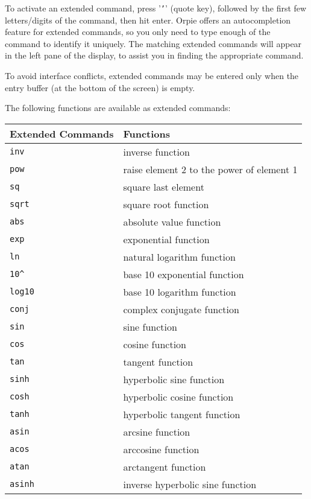 \documentclass[11pt,notitlepage]{article}
\begin{document}
To activate an extended command, press '{\tt '}' (quote key), followed by the
first few letters/digits of the command, then hit enter.  Orpie offers an
autocompletion feature for extended commands, so you only need to type enough of
the command to identify it uniquely.  The matching extended commands will appear
in the left pane of the display, to assist you in finding the appropriate
command.

To avoid interface conflicts, extended commands may be entered only when the
entry buffer (at the bottom of the screen) is empty.

The following functions are available as extended commands:
\begin{center}
   \begin{tabular}[t]{|l|l|}
      \hline Extended Commands & Functions \\
      \hline
      {\tt inv} & inverse function \\
      {\tt pow} & raise element 2 to the power of element 1 \\
      {\tt sq}  & square last element \\
      {\tt sqrt} & square root function \\
      {\tt abs } & absolute value function \\
      {\tt exp } & exponential function \\
      {\tt ln } & natural logarithm function \\
      {\tt 10\^{} } & base 10 exponential function \\
      {\tt log10 } & base 10 logarithm function \\
      {\tt conj } & complex conjugate function \\
      {\tt sin} & sine function \\
      {\tt cos} & cosine function \\
      {\tt tan} & tangent function \\
      {\tt sinh} & hyperbolic sine function \\
      {\tt cosh} & hyperbolic cosine function \\
      {\tt tanh} & hyperbolic tangent function \\
      {\tt asin} & arcsine function \\
      {\tt acos} & arccosine function \\
      {\tt atan} & arctangent function \\
      {\tt asinh} & inverse hyperbolic sine function \\

\end{tabular}
\end{center}
\end{document}
